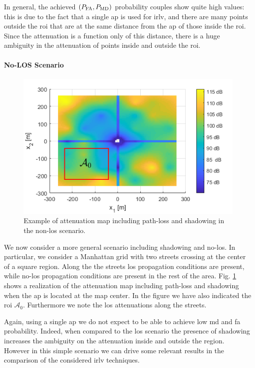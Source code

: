 \documentclass[draftcls,onecolumn,12pt]{IEEEtran}
\begin{document}
In general, the achieved $(P_{\rm FA}, P_{\rm MD})$ probability couples show quite high values: this is due to the fact that a single \ac{ap} is used for \ac{irlv}, and there are many points outside the \ac{roi} that are at the same distance from the \ac{ap} of those inside the \ac{roi}. Since the attenuation is a function only of this distance, there is a huge ambiguity in the attenuation of points inside and outside the \ac{roi}.

\paragraph*{No-LOS Scenario} 

\begin{figure}[t]
    \centering
    \includegraphics[width=0.6\columnwidth]{surfColorato.png}
    \caption{Example of attenuation map including path-loss and shadowing in the non-\ac{los} scenario.}
    \label{fig:map}
\end{figure}

We now consider a more general scenario including shadowing and no-\ac{los}. In particular, we consider a Manhattan grid with two streets crossing at the center of a square region. Along the the streets \ac{los} propagation conditions are present, while no-\ac{los} propagation conditions are present in the rest of the area. Fig. \ref{fig:map} shows a realization of the  attenuation map including path-loss and shadowing when the \ac{ap} is located at the map center. In the figure we have also indicated the \ac{roi} $\mathcal{A}_0$. Furthermore we note the \ac{los} attenuations along the streets.

Again, using a single \ac{ap} we do not expect to be able to achieve low \ac{md} and \ac{fa} probability. Indeed, when compared to the \ac{los} scenario the presence of shadowing increases the ambiguity on the attenuation inside and outside the region. However in this simple scenario we can drive some relevant results in the comparison of the considered \ac{irlv} techniques. 
\end{document}
